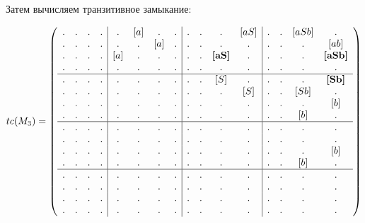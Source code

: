 \begin{example}
Затем вычисляем транзитивное замыкание:

\begin{align}
tc(M_3) =
\left(\begin{array}{c c c c | c c c c | c c c c | c c c c } 
. & . & . & .  &  . & [a] & . & .  &  . & . & . & [aS]           &  . & . & [aSb] & .     \\
. & . & . & .  &  . & . & [a] & .  &  . & . & . & .              &  . & . & .     & [ab]  \\
. & . & . & .  &  [a] & . & . & .  &  . & . & \textbf{[aS]} & .  &  . & . & .     & \textbf{[aSb]} \\
. & . & . & .  &  . & . & . & .    &  . & . & . & .              &  . & . & .     & .     \\
\hline
. & . & . & .  &  . & . & . & .    &  . & . & [S] & .            &  . & . & .    & \textbf{[Sb]}    \\
. & . & . & .  &  . & . & . & .    &  . & . & . & [S]            &  . & . & [Sb] & .    \\
. & . & . & .  &  . & . & . & .    &  . & . & . & .              &  . & . & .    & [b]  \\
. & . & . & .  &  . & . & . & .    &  . & . & . & .              &  . & . & [b]  & .    \\
\hline                                                              
. & . & . & .  &  . & . & . & .    &  . & . & . & .              &  . & . & . & .   \\
. & . & . & .  &  . & . & . & .    &  . & . & . & .              &  . & . & . & .   \\
. & . & . & .  &  . & . & . & .    &  . & . & . & .              &  . & . & . & [b] \\
. & . & . & .  &  . & . & . & .    &  . & . & . & .              &  . & . & [b] & . \\
\hline                                                              
. & . & . & .  &  . & . & . & .    &  . & . & . & .              &  . & . & . & .   \\
. & . & . & .  &  . & . & . & .    &  . & . & . & .              &  . & . & . & .   \\
. & . & . & .  &  . & . & . & .    &  . & . & . & .              &  . & . & . & .   \\
. & . & . & .  &  . & . & . & .    &  . & . & . & .              &  . & . & . & . 
\end{array}\right)
\end{align}


\end{example}
